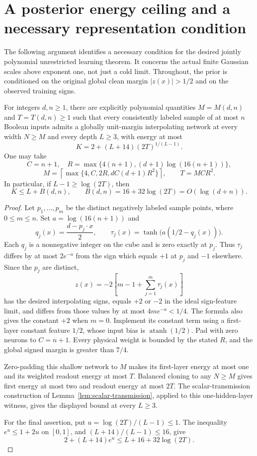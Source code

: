 \section{A posterior energy ceiling and a necessary representation condition}
\label{sec:posterior-energy-ceiling}

The following argument identifies a necessary condition for the desired
jointly polynomial unrestricted learning theorem. It concerns the actual
finite Gaussian scales above exponent one, not just a cold limit.
Throughout, the prior is conditioned on the original global clean margin
$|z(x)|>1/2$ and on the observed training signs.

\begin{lemma}
\label{lem:uniform-memorizing-witness}
For integers $d,n\ge1$, there are explicitly polynomial quantities
$M=M(d,n)$ and $T=T(d,n)\ge1$ such that every consistently labeled sample
of at most $n$ Boolean inputs admits a globally unit-margin interpolating
network at every width $N\ge M$ and every depth $L\ge3$, with energy at most
\[
 K=2+(L+14)(2T)^{1/(L-1)}.
\]
One may take
\[
 C=n+1,\quad
 R=\max\{4(n+1),(d+1)\log(16(n+1))\},
\]
\[
 M=\left\lceil\max\{4,C,2R,dC(d+1)R^2\}\right\rceil,
 \qquad T=MCR^2.
\]
In particular, if $L-1\ge\log(2T)$, then
\[
 K\le L+B(d,n),\qquad B(d,n)=16+32\log(2T)=O(\log(d+n)).
\]
\end{lemma}

\begin{proof}
Let $p_1,\ldots,p_m$ be the distinct negatively labeled sample points,
where $0\le m\le n$. Set $a=\log(16(n+1))$ and
\[
 q_j(x)=\frac{d-p_j\cdot x}{2},\qquad
 \tau_j(x)=\tanh\bigl(a(1/2-q_j(x))\bigr).
\]
Each $q_j$ is a nonnegative integer on the cube and is zero exactly at
$p_j$. Thus $\tau_j$ differs by at most $2e^{-a}$ from the sign which
equals $+1$ at $p_j$ and $-1$ elsewhere. Since the $p_j$ are distinct,
\[
 z(x)=-2\left[m-1+\sum_{j=1}^m\tau_j(x)\right]
\]
has the desired interpolating signs, equals $+2$ or $-2$ in the ideal
sign-feature limit, and differs from those values by at most
$4me^{-a}<1/4$. The formula also gives the constant $+2$ when $m=0$.
Implement its constant term using a first-layer constant feature $1/2$,
whose input bias is $\operatorname{atanh}(1/2)$. Pad with zero neurons
to $C=n+1$. Every physical weight is bounded by the stated $R$, and the
global signed margin is greater than $7/4$.

Zero-padding this shallow network to $M$ makes its first-layer energy
at most one and its weighted readout energy at most $T$. Balanced
cloning to any $N\ge M$ gives first energy at most two and readout
energy at most $2T$. The scalar-transmission construction of
Lemma~\ref{lem:scalar-transmission},
applied to this one-hidden-layer witness, gives the displayed bound
at every $L\ge3$.

For the final assertion, put $u=\log(2T)/(L-1)\le1$. The inequality
$e^u\le1+2u$ on $[0,1]$, and
$(L+14)/(L-1)\le16$, give
\[
 2+(L+14)e^u\le L+16+32\log(2T).
\]
\end{proof}

